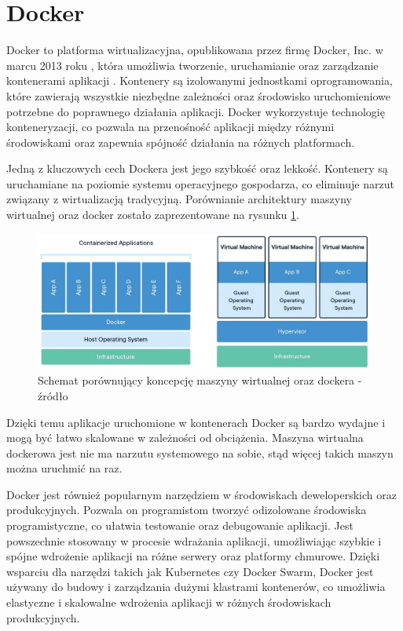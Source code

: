 \section{Docker}

Docker to platforma wirtualizacyjna, opublikowana przez firmę Docker, Inc. w marcu 2013 roku \cite{archiveDotCloudAbout}, która umożliwia tworzenie, uruchamianie oraz zarządzanie kontenerami aplikacji \cite{dockerHome}. 
Kontenery są izolowanymi jednostkami oprogramowania, które zawierają wszystkie niezbędne zależności oraz środowisko uruchomieniowe potrzebne do poprawnego działania aplikacji.
Docker wykorzystuje technologię konteneryzacji, co pozwala na przenośność aplikacji między różnymi środowiskami oraz zapewnia spójność działania na różnych platformach.

Jedną z kluczowych cech Dockera jest jego szybkość oraz lekkość.
Kontenery są uruchamiane na poziomie systemu operacyjnego gospodarza, co eliminuje narzut związany z wirtualizacją tradycyjną.
Porównianie architektury maszyny wirtualnej oraz docker zostało zaprezentowane na rysunku \ref{rys:docker-vs-vm}.

\begin{figure}[!hb]
	\centering \includegraphics[width=1\linewidth]{rysunki/docker-vs-vm.jpg}
	\caption{Schemat porównujący koncepcję maszyny wirtualnej oraz dockera - źródło \cite{cherryserversOverview}}
	\label{rys:docker-vs-vm}
\end{figure}

Dzięki temu aplikacje uruchomione w kontenerach Docker są bardzo wydajne i mogą być łatwo skalowane w zależności od obciążenia.
Maszyna wirtualna dockerowa jest nie ma narzutu systemowego na sobie, stąd więcej takich maszyn można uruchmić na raz.

Docker jest również popularnym narzędziem w środowiskach deweloperskich oraz produkcyjnych.
Pozwala on programistom tworzyć odizolowane środowiska programistyczne, co ułatwia testowanie oraz debugowanie aplikacji.
Jest powszechnie stosowany w procesie wdrażania aplikacji, umożliwiając szybkie i spójne wdrożenie aplikacji na różne serwery oraz platformy chmurowe.
Dzięki wsparciu dla narzędzi takich jak Kubernetes czy Docker Swarm, Docker jest używany do budowy i zarządzania dużymi klastrami kontenerów, co umożliwia elastyczne i skalowalne wdrożenia aplikacji w różnych środowiskach produkcyjnych.

